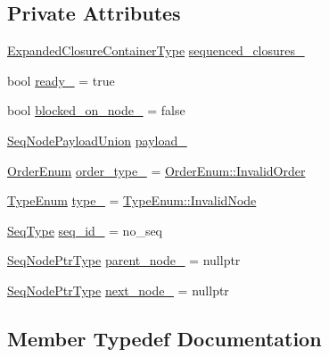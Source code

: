 \subsection*{Private Attributes}
\begin{DoxyCompactItemize}
\item 
\hyperlink{structvt_1_1seq_1_1_seq_node_aff21f386bb9bce2ce5c940edffcdb0a0}{Expanded\+Closure\+Container\+Type} \hyperlink{structvt_1_1seq_1_1_seq_node_a16ba1129f59e1c69fc16a92a7aa5531f}{sequenced\+\_\+closures\+\_\+}
\item 
bool \hyperlink{structvt_1_1seq_1_1_seq_node_abf5e0ac7e65fd53a1f5fd9f6803d5b20}{ready\+\_\+} = true
\item 
bool \hyperlink{structvt_1_1seq_1_1_seq_node_a92c37e08aca5bd90a86870ddf6049cd1}{blocked\+\_\+on\+\_\+node\+\_\+} = false
\item 
\hyperlink{structvt_1_1seq_1_1_seq_node_a4550535aff445a28557a1edb9508a6bc}{Seq\+Node\+Payload\+Union} \hyperlink{structvt_1_1seq_1_1_seq_node_aef15e9c8f113f8d0b512ef12cf502aa8}{payload\+\_\+}
\item 
\hyperlink{namespacevt_1_1seq_a313357c71bba2bea5c57f50d69f1edf7}{Order\+Enum} \hyperlink{structvt_1_1seq_1_1_seq_node_a2c388dbd439d8cbe8b3b6461bf4e674a}{order\+\_\+type\+\_\+} = \hyperlink{namespacevt_1_1seq_a313357c71bba2bea5c57f50d69f1edf7abad0e5f1d99f90302a70e1ae24269bb9}{Order\+Enum\+::\+Invalid\+Order}
\item 
\hyperlink{namespacevt_1_1seq_ae721d4e8b95cf57a7e4169db1929e0f1}{Type\+Enum} \hyperlink{structvt_1_1seq_1_1_seq_node_a77b3c29f4ae9e973359fb1629b8aca24}{type\+\_\+} = \hyperlink{namespacevt_1_1seq_ae721d4e8b95cf57a7e4169db1929e0f1a8d430d6250b6f558562aace5b6a5a8de}{Type\+Enum\+::\+Invalid\+Node}
\item 
\hyperlink{namespacevt_1_1seq_a3b612da217ac669d39c159f134ab8434}{Seq\+Type} \hyperlink{structvt_1_1seq_1_1_seq_node_a1c633c25e1596b4d5f83db7727b36e47}{seq\+\_\+id\+\_\+} = no\+\_\+seq
\item 
\hyperlink{namespacevt_1_1seq_ae6a4874b585be0612aaca32ca6d2d191}{Seq\+Node\+Ptr\+Type} \hyperlink{structvt_1_1seq_1_1_seq_node_a675271da829824dd3331950092ce84d0}{parent\+\_\+node\+\_\+} = nullptr
\item 
\hyperlink{namespacevt_1_1seq_ae6a4874b585be0612aaca32ca6d2d191}{Seq\+Node\+Ptr\+Type} \hyperlink{structvt_1_1seq_1_1_seq_node_a168421e6d8e2171227445dc5e7740d01}{next\+\_\+node\+\_\+} = nullptr
\end{DoxyCompactItemize}


\subsection{Member Typedef Documentation}
\mbox{\label{structvt_1_1seq_1_1_seq_node_aff21f386bb9bce2ce5c940edffcdb0a0}} 
